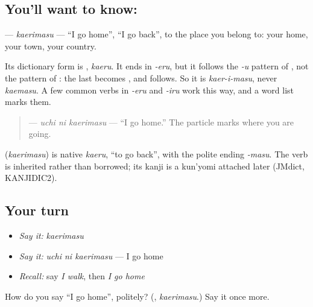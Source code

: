 \subsection*{You'll want to know: }
\textbf{} — \emph{kaerimasu} — \textquotedblleft{}I go home\textquotedblright{}, \textquotedblleft{}I go back\textquotedblright{}, to the place you belong to: your home, your town, your country.

Its dictionary form is \textbf{}, \emph{kaeru}. It ends in \emph{-eru}, but it follows the \emph{-u} pattern of \textbf{}, not the pattern of \textbf{}: the last \textbf{} becomes \textbf{}, and \textbf{} follows. So it is \emph{kaer-i-masu}, never \emph{kaemasu}. A few common verbs in \emph{-eru} and \emph{-iru} work this way, and a word list marks them.

\begin{quote}
\textbf{ } — \emph{uchi ni kaerimasu} — \textquotedblleft{}I go home.\textquotedblright{} The particle \textbf{} marks where you are going.
\end{quote}

\begin{cousinweb}
\textbf{} (\emph{kaerimasu}) is native \emph{kaeru}, \textquotedblleft{}to go back\textquotedblright{}, with the polite ending \emph{-masu}. The verb is inherited rather than borrowed; its kanji is a kun'yomi attached later (JMdict, KANJIDIC2).
\end{cousinweb}

\subsection*{Your turn}
\begin{itemize}
\raggedright
  \item \emph{Say it:} \emph{kaerimasu}
  \item \emph{Say it:} \emph{uchi ni kaerimasu} — I go home
  \item \emph{Recall:} say \emph{I walk}, then \emph{I go home}
\end{itemize}

\begin{tcolorbox}[breakable,colback=teal!4,colframe=teal!35!black,title={Before you move on}]
How do you say \textquotedblleft{}I go home\textquotedblright{}, politely? (\textbf{}, \emph{kaerimasu}.) Say it once more.
\end{tcolorbox}
